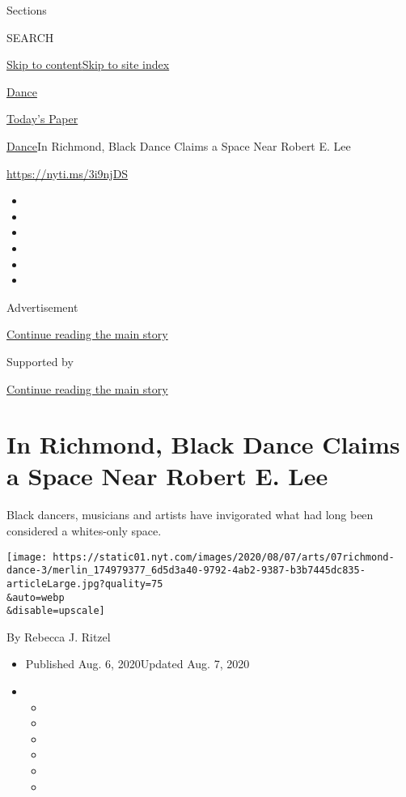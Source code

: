 Sections

SEARCH

\protect\hyperlink{site-content}{Skip to
content}\protect\hyperlink{site-index}{Skip to site index}

\href{https://www.nytimes.com/section/arts/dance}{Dance}

\href{https://myaccount.nytimes.com/auth/login?response_type=cookie\&client_id=vi}{}

\href{https://www.nytimes.com/section/todayspaper}{Today's Paper}

\href{/section/arts/dance}{Dance}\textbar{}In Richmond, Black Dance
Claims a Space Near Robert E. Lee

\href{https://nyti.ms/3i9njDS}{https://nyti.ms/3i9njDS}

\begin{itemize}
\item
\item
\item
\item
\item
\item
\end{itemize}

Advertisement

\protect\hyperlink{after-top}{Continue reading the main story}

Supported by

\protect\hyperlink{after-sponsor}{Continue reading the main story}

\hypertarget{in-richmond-black-dance-claims-a-space-near-robert-e-lee}{%
\section{In Richmond, Black Dance Claims a Space Near Robert E.
Lee}\label{in-richmond-black-dance-claims-a-space-near-robert-e-lee}}

Black dancers, musicians and artists have invigorated what had long been
considered a whites-only space.

\texttt{[image: https://static01.nyt.com/images/2020/08/07/arts/07richmond-dance-3/merlin\_174979377\_6d5d3a40-9792-4ab2-9387-b3b7445dc835-articleLarge.jpg?quality=75\\\&auto=webp\\\&disable=upscale]}

By Rebecca J. Ritzel

\begin{itemize}
\item
  Published Aug. 6, 2020Updated Aug. 7, 2020
\item
  \begin{itemize}
  \item
  \item
  \item
  \item
  \item
  \item
  \end{itemize}
\end{itemize}

